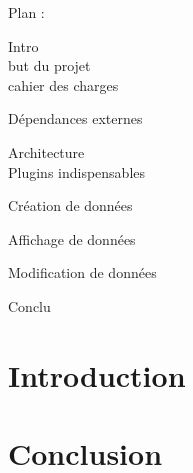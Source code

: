 \documentclass[a4paper]{report}
\begin{document}



\tableofcontents

Plan : 

	Intro\\
		but du projet\\
		cahier des charges

	Dépendances externes

	Architecture  \\
		Plugins indispensables

		Création de données

		Affichage de données

		Modification de données

	Conclu
		


\chapter*{Introduction}
%


\chapter*{Conclusion}
%
\end{document}
